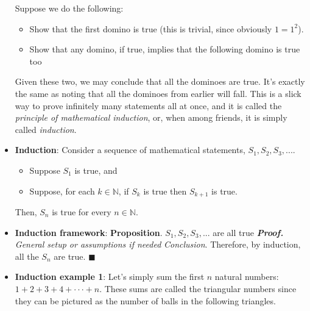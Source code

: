 \documentclass{report}
\begin{document}
\begin{itemize}
            \bigbreak \noindent 
            \bigbreak \noindent 
            Suppose we do the following:
            \begin{itemize}
                \item Show that the first domino is true (this is trivial, since obviously $1=1^{2} $).
                \item Show that any domino, if true, implies that the following domino is true too
            \end{itemize}
            Given these two, we may conclude that all the dominoes are true. It’s exactly the same as noting that all the dominoes from earlier will fall. This is a slick way to prove infinitely many statements all at once, and it is called the \textit{principle of mathematical induction}, or, when among friends, it is simply called \textit{induction}.
        \item \textbf{Induction}: Consider a sequence of mathematical statements, $S_{1}, S_{2}, S_{3}, . . . .$
            \begin{itemize}
                \item Suppose $S_{1}$ is true, and
                \item Suppose, for each $k \in \mathbb{N}$, if $S_{k}$ is true then $S_{k+1}$ is true.
            \end{itemize}
            Then, $S_{n} $ is true for every $n\in \mathbb{N}$.
        \item \textbf{Induction framework}:
            \bigbreak \noindent 
            \textbf{Proposition}. $S_{1}, S_{2}, S_{3},... $ are all true
            \bigbreak \noindent 
            \textbf{\textit{Proof.}} \textit{General setup or assumptions if needed}
            \textit{Conclusion}. Therefore, by induction, all the $S_{n}$ are true. \hspace{5cm} $\blacksquare $
        \item \textbf{Induction example 1}: Let’s simply sum the first $n$ natural numbers: $1 + 2 + 3 + 4 + · · · + n$. These sums are called the triangular numbers since they can be pictured as the number of balls in the following triangles.

\end{itemize}
\end{document}
